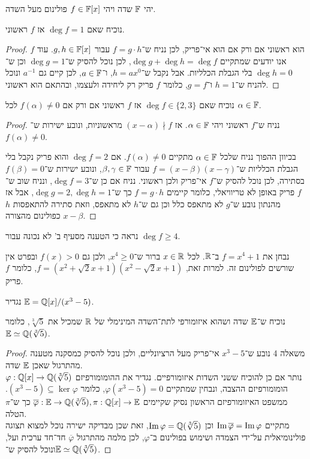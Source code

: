 \question{}
יהי $\mathbb{F}$ שדה ויהי $f \in \mathbb{F}[x]$ פולינום מעל השדה.

\subquestion{}
נוכיח שאם $\deg f = 1$ אז $f$ ראשוני.
\begin{proof}
	$f$ הוא ראשוני אם ורק אם הוא אי־פריק, לכן נניח ש־$f = g \cdot h$ עבור $g, h \in \mathbb{F}[x]$.
	עוד אנו יודעים שמתקיים $\deg g + \deg h = \deg f$, לכן נוכל להסיק ש־$\deg g = 1$ וכן ש־$\deg h = 0$ בלי הגבלת הכלליות.
	אבל נקבל ש־$h = a x^0$, ו־$a \in \mathbb{F}$, לכן קיים גם $a^{-1}$ ונוכל להניח ש־$h = 1$ ו־$g = f$, כלומר $f$ פריק רק ליחידה ולעצמו, ובהתאם הוא ראשוני.
\end{proof}

\subquestion{}
נוכיח שאם $\deg f \in \{2, 3\}$ אז $f$ ראשוני אם ורק אם $f(\alpha) \ne 0$ לכל $\alpha \in \mathbb{F}$.
\begin{proof}
	נניח ש־$f$ ראשוני ויהי $\alpha \in \mathbb{F}$.
	אז $(x - \alpha) \nmid f$ מראשוניות, ונובע ישירות ש־$f(\alpha) \ne 0$.

	בכיוון ההפוך נניח שלכל $\alpha \in \mathbb{F}$ מתקיים $f(\alpha) \ne 0$.
	אם $\deg f = 2$ והוא פריק נקבל בלי הגבלת הכלליות ש־$f = (x - \beta)(x - \gamma)$ עבור $\beta, \gamma \in \mathbb{F}$, ונובע ישירות ש־$f(\beta) = 0$ בסתירה, לכן נוכל להסיק ש־$f$ אי־פריק ולכן ראשוני.
	נניח אם כן ש־$\deg f = 3$, ונניח שוב ש־$f$ פריק באופן לא טריוויאלי, כלומר קיימים $f = g \cdot h$ כך ש־$\deg g = 2, \deg h = 1$,
	אבל אז מהנתון נובע ש־$g$ לא מתאפס כלל וכן גם ש־$h$ לא מתאפס, וזאת סתירה להתאפסות $h$ כפולינום מהצורה $x - \beta$.
\end{proof}

\subquestion{}
נראה כי הטענה מסעיף ב' לא נכונה עבור $\deg f \ge 4$.
\begin{solution}
	נבחן את $f = x^4 + 1$ ב־$\mathbb{R}$.
	לכל $x \in \mathbb{R}$ ברור ש־$x^4 \ge 0$, ולכן גם $f(x) > 0$ ובפרט אין שורשים לפולינום זה.
	למרות זאת, $f = (x^2 + \sqrt{2}x + 1)(x^2 - \sqrt{2}x + 1)$, כלומר $f$ פריק.
\end{solution}

\question{}
נגדיר $\mathbb{E} = \mathbb{Q}[x] / (x^3 - 5)$.

\subquestion{}
נוכיח ש־$\mathbb{E}$ שדה ושהוא איזומורפי לתת־השדה המינימלי של $\mathbb{R}$ שמכיל את $\sqrt[3]{5}$, כלומר $\mathbb{E} \simeq \mathbb{Q}(\sqrt[3]{5})$.
\begin{proof}
	משאלה 4 נובע ש־$x^3 - 5$ אי־פריק מעל הרציונליים, ולכן נוכל להסיק כמסקנה מטענה מהתרגול שאכן $\mathbb{E}$ שדה. \\
	נותר אם כן להוכיח ששני השדות איזומורפיים.
	נגדיר את ההומומורפיזם $\varphi : \mathbb{Q}[x] \to \mathbb{Q}(\sqrt[3]{5})$ הומומורפיזם ההצבה, ונבחין שמתקיים $\varphi(x^3 - 5) = 0$, כלומר $(x^3 - 5) \subseteq \ker \varphi$.
	ממשפט האיזומורפיזם הראשון נסיק שקיימים $\overline{\varphi} : \mathbb{E} \to \mathbb{Q}(\sqrt[3]{5}), \pi : \mathbb{Q}[x] \to \mathbb{E}$ כך ש־$\pi$ הטלה. \\
	מתקיים $\operatorname{Im} \overline{\varphi} = \operatorname{Im} \varphi$ וכן $\operatorname{Im} \varphi = \mathbb{Q}(\sqrt[3]{5})$, זאת שכן מבדיקה ישירה נוכל למצוא תצוגה פולינומיאלית על־ידי הצמדה ושימוש בפולינום ב־$\varphi$,
	לכן מלמה מהתרגול $\overline{\varphi}$ חד־חד ערכית ועל, ונוכל להסיק ש־$\mathbb{E} \simeq \mathbb{Q}(\sqrt[3]{5})$.
\end{proof}

